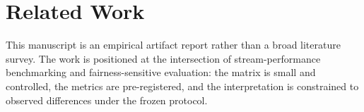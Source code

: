 \section{Related Work}
This manuscript is an empirical artifact report rather than a broad literature survey.
The work is positioned at the intersection of stream-performance benchmarking and fairness-sensitive evaluation:
the matrix is small and controlled, the metrics are pre-registered, and the interpretation is constrained to
observed differences under the frozen protocol.
